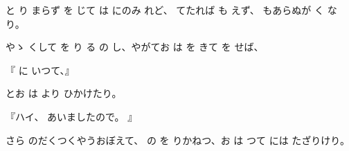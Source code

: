 と
り
まらず
を
じて
は
にのみ
れど、
てたれば
も
えず、
もあらぬが
く
なり。

やゝ
くして
を
り
る
の
し、やがてお
は
を
きて
を
せば、

『
に
いつて、』

とお
は
より
ひかけたり。

『ハイ、
あいましたので。
』

さら
のだくつくやうおぼえて、
の
を
りかねつ、お
は
つて
には
たざりけり。

